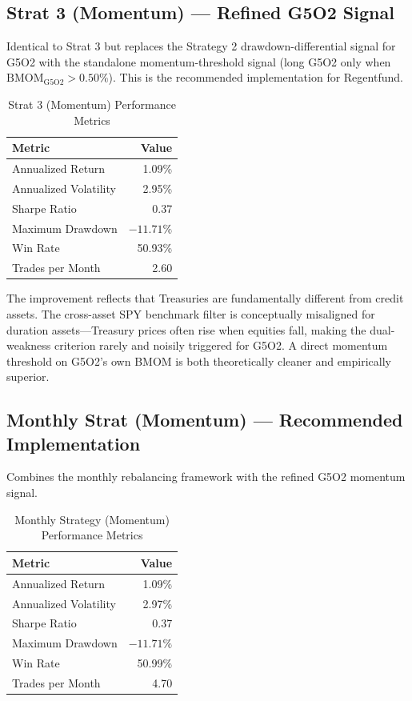 \documentclass[11pt]{article}
\begin{document}
\subsection{Strat 3 (Momentum) --- Refined G5O2 Signal}

Identical to Strat 3 but replaces the Strategy 2 drawdown-differential signal for G5O2 with the standalone momentum-threshold signal (long G5O2 only when $\text{BMOM}_{\text{G5O2}} > 0.50\%$). This is the recommended implementation for Regentfund.

\begin{table}[H]
\centering
\caption{Strat 3 (Momentum) Performance Metrics}
\begin{tabular}{lr}
\toprule
\textbf{Metric} & \textbf{Value} \\
\midrule
Annualized Return & 1.09\% \\
Annualized Volatility & 2.95\% \\
Sharpe Ratio & 0.37 \\
Maximum Drawdown & $-11.71\%$ \\
Win Rate & 50.93\% \\
Trades per Month & 2.60 \\
\bottomrule
\end{tabular}
\end{table}

The improvement reflects that Treasuries are fundamentally different from credit assets. The cross-asset SPY benchmark filter is conceptually misaligned for duration assets---Treasury prices often rise when equities fall, making the dual-weakness criterion rarely and noisily triggered for G5O2. A direct momentum threshold on G5O2's own BMOM is both theoretically cleaner and empirically superior.

\subsection{Monthly Strat (Momentum) --- Recommended Implementation}

Combines the monthly rebalancing framework with the refined G5O2 momentum signal.

\begin{table}[H]
\centering
\caption{Monthly Strategy (Momentum) Performance Metrics}
\begin{tabular}{lr}
\toprule
\textbf{Metric} & \textbf{Value} \\
\midrule
Annualized Return & 1.09\% \\
Annualized Volatility & 2.97\% \\
Sharpe Ratio & 0.37 \\
Maximum Drawdown & $-11.71\%$ \\
Win Rate & 50.99\% \\
Trades per Month & 4.70 \\
\bottomrule
\end{tabular}
\end{table}
\end{document}
